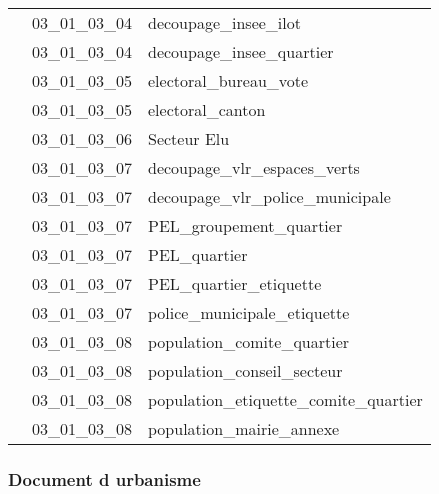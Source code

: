 \documentclass[12pt,titlepage,oneside]{book}
\begin{document}
\begin{supertabular}{|p{10cm}|c|p{15cm}|}
                    & 03\_01\_03\_04 & decoupage\_insee\_ilot\\


                    & 03\_01\_03\_04 & decoupage\_insee\_quartier\\


                    & 03\_01\_03\_05 & electoral\_bureau\_vote\\


                    & 03\_01\_03\_05 & electoral\_canton\\


                    & 03\_01\_03\_06 & Secteur Elu\\


                    & 03\_01\_03\_07 & decoupage\_vlr\_espaces\_verts\\


                    & 03\_01\_03\_07 & decoupage\_vlr\_police\_municipale\\


                    & 03\_01\_03\_07 & PEL\_groupement\_quartier\\


                    & 03\_01\_03\_07 & PEL\_quartier\\


                    & 03\_01\_03\_07 & PEL\_quartier\_etiquette\\


                    & 03\_01\_03\_07 & police\_municipale\_etiquette\\


                    & 03\_01\_03\_08 & population\_comite\_quartier\\


                    & 03\_01\_03\_08 & population\_conseil\_secteur\\


                    & 03\_01\_03\_08 & population\_etiquette\_comite\_quartier\\


                    & 03\_01\_03\_08 & population\_mairie\_annexe\\
\hline
\end{supertabular}

\subsubsection{\large Document d urbanisme}
\end{document}
